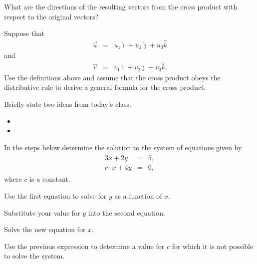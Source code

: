 \begin{problem}
\begin{subproblem}
  \item What are the directions of the resulting vectors from the cross product with respect to the original vectors?
    \vspace{2em}

    \clearpage

  \item Suppose that
    \begin{eqnarray*}
      \vec{u} & = & u_1 \hat{\imath} + u_2 \hat{\jmath} + u_3 \hat{k}
    \end{eqnarray*}
    and
    \begin{eqnarray*}
      \vec{v} & = & v_1 \hat{\imath} + v_2 \hat{\jmath} + v_3 \hat{k}.
    \end{eqnarray*}
    Use the definitions above and assume that the cross product obeys
    the distributive rule to derive a general formula for the cross product.
    \vfill

  \end{subproblem}
\end{problem}


\postClass

\begin{problem}
\item Briefly state two ideas from today's class.
  \begin{itemize}
  \item
  \item
  \end{itemize}
\item
  \begin{subproblem}
    \item
  \end{subproblem}
\end{problem}


\begin{problem}
\item In the steps below determine the solution to the system of equations given by
\begin{eqnarray*}
  \begin{array}{lcl}
    3x + 2y & = & 5, \\
    c \cdot x + 4y & = & 6,
  \end{array}
\end{eqnarray*}
where $c$ is a constant.
\begin{subproblem}
  \item Use the first equation to solve for $y$ as a function of $x$.
    \vfill
  \item Substitute your value for $y$ into the second equation.
    \vfill
  \item Solve the new equation for $x$.
    \vfill
  \item Use the previous expression to determine a value for $c$ for which it is not possible to solve the system.
    \vfill
\end{subproblem}
\end{problem}


